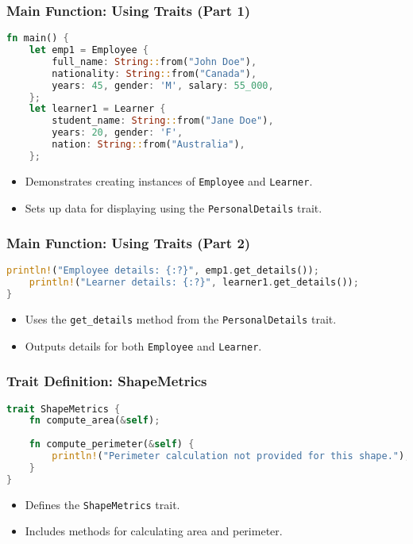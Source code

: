 \documentclass[aspectratio=169, table]{beamer}
\begin{document}
\begin{frame}[fragile]
\frametitle{Main Function: Using Traits (Part 1)}
\vspace{20pt}
\begin{lstlisting}[language=Rust]
fn main() {
	let emp1 = Employee {
		full_name: String::from("John Doe"),
		nationality: String::from("Canada"),
		years: 45, gender: 'M', salary: 55_000,
	};	
	let learner1 = Learner {
		student_name: String::from("Jane Doe"),
		years: 20, gender: 'F',
		nation: String::from("Australia"),
	};
\end{lstlisting}
\begin{itemize}
\item Demonstrates creating instances of \texttt{Employee} and \texttt{Learner}.
\item Sets up data for displaying using the \texttt{PersonalDetails} trait.
\end{itemize}
\end{frame}

\begin{frame}[fragile]
\frametitle{Main Function: Using Traits (Part 2)}
\begin{lstlisting}[language=Rust]
	println!("Employee details: {:?}", emp1.get_details());
	println!("Learner details: {:?}", learner1.get_details());
}
\end{lstlisting}
\begin{itemize}
\item Uses the \texttt{get\_details} method from the \texttt{PersonalDetails} trait.
\item Outputs details for both \texttt{Employee} and \texttt{Learner}.
\end{itemize}
\end{frame}


\begin{frame}[fragile]
\frametitle{Trait Definition: ShapeMetrics}
\begin{lstlisting}[language=Rust]
trait ShapeMetrics {
	fn compute_area(&self);
	
	fn compute_perimeter(&self) {
		println!("Perimeter calculation not provided for this shape.");
	}
}
\end{lstlisting}
\begin{itemize}
\item Defines the \texttt{ShapeMetrics} trait.
\item Includes methods for calculating area and perimeter.
\end{itemize}
\end{frame}
\end{document}
